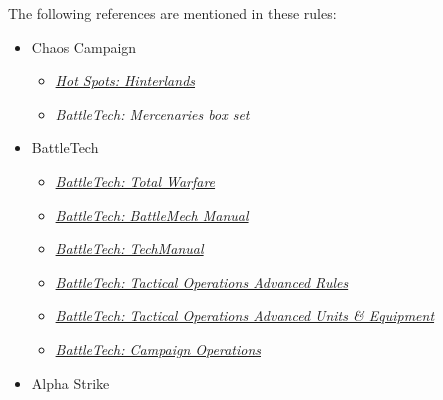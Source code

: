 The following references are mentioned in these rules:

\begin{itemize}

\item Chaos Campaign

  \begin{itemize}

    \item \emph{\href{https://store.catalystgamelabs.com/products/battletech-hot-spots-hinterlands}{Hot Spots: Hinterlands}}

    \item \emph{BattleTech: Mercenaries box set}

  \end{itemize}

  \item BattleTech

  \begin{itemize}

    \item \emph{\href{https://store.catalystgamelabs.com/products/battletech-total-warfare-pdf}{BattleTech: Total Warfare}}

    \item \emph{\href{https://store.catalystgamelabs.com/products/battletech-battlemech-manual-book-pdf-combo}{BattleTech: BattleMech Manual}}

    \item \emph{\href{https://store.catalystgamelabs.com/products/battletech-techmanual-book-pdf}{BattleTech: TechManual}}

    \item \emph{\href{https://store.catalystgamelabs.com/products/battletech-tactical-operations-advanced-rules}{BattleTech: Tactical Operations Advanced Rules}}

    \item \emph{\href{https://store.catalystgamelabs.com/products/battletech-tactical-operations-advanced-units-equipement}{BattleTech: Tactical Operations Advanced Units \& Equipment}}

    \item \emph{\href{https://store.catalystgamelabs.com/products/battletech-campaign-operations-pdf}{BattleTech: Campaign Operations}}

  \end{itemize}

  \item Alpha Strike

  \begin{itemize}


\end{itemize}
\end{itemize}
